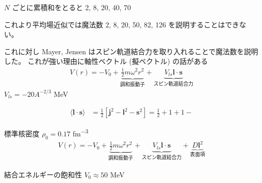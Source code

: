 \documentclass[uplatex,dvipdfmx,a4paper,11pt]{jlreq}
\numberwithin{equation}{section}
\theoremstyle{definition}
\begin{document}
$N$ ごとに累積和をとると 2, 8, 20, 40, 70

これより平均場近似では魔法数 2, 8, 20, 50, 82, 126 を説明することはできない。

これに対し Mayer, Jensen はスピン軌道結合力を取り入れることで魔法数を説明した。
これが強い理由に軸性ベクトル (擬ベクトル) の話がある
\begin{align}
  V(r) = -V_0 + \underbrace{\frac{1}{2}m\omega^2r^2}_{調和振動⼦} + \underbrace{V_{ls}\bm{l}\cdot\bm{s}}_{スピン軌道結合力}
\end{align}
$V_{ls} = -20A^{-2/3}$ \si{MeV}

\begin{align}
  \langle \bm{l}\cdot\bm{s}\rangle & = \frac{1}{2}[\bm{j}^2 - \bm{l}^2 - \bm{s}^2] = \frac{1}{2} + 1 + 1-
\end{align}

標準核密度 $\rho_0 = 0.17$ \si{fm^{-3}}
\begin{align}
  V(r) = -V_0 + \underbrace{\frac{1}{2}m\omega^2r^2}_{調和振動⼦} + \underbrace{V_{ls}\bm{l}\cdot\bm{s}}_{スピン軌道結合力} + \underbrace{D\bm{l}^2}_{表面項}
\end{align}


結合エネルギーの飽和性
$V_0 \approx 50$ \si{MeV}
\end{document}
